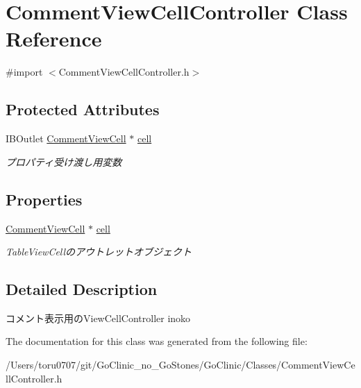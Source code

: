 \hypertarget{interface_comment_view_cell_controller}{
\section{CommentViewCellController Class Reference}
\label{interface_comment_view_cell_controller}
}


{\ttfamily \#import $<$CommentViewCellController.h$>$}

\subsection*{Protected Attributes}
\begin{DoxyCompactItemize}
\item 
\hypertarget{interface_comment_view_cell_controller_ae0ac0956e5d70534a5725597e9b26d9e}{
IBOutlet \hyperlink{interface_comment_view_cell}{CommentViewCell} $\ast$ \hyperlink{interface_comment_view_cell_controller_ae0ac0956e5d70534a5725597e9b26d9e}{cell}}
\label{interface_comment_view_cell_controller_ae0ac0956e5d70534a5725597e9b26d9e}

\begin{DoxyCompactList}\small\item\em プロパティ受け渡し用変数 \end{DoxyCompactList}\end{DoxyCompactItemize}
\subsection*{Properties}
\begin{DoxyCompactItemize}
\item 
\hypertarget{interface_comment_view_cell_controller_a951779506547b1ff03a16f911d7abf98}{
\hyperlink{interface_comment_view_cell}{CommentViewCell} $\ast$ \hyperlink{interface_comment_view_cell_controller_a951779506547b1ff03a16f911d7abf98}{cell}}
\label{interface_comment_view_cell_controller_a951779506547b1ff03a16f911d7abf98}

\begin{DoxyCompactList}\small\item\em TableViewCellのアウトレットオブジェクト \end{DoxyCompactList}\end{DoxyCompactItemize}


\subsection{Detailed Description}
コメント表示用のViewCellController  inoko 

The documentation for this class was generated from the following file:\begin{DoxyCompactItemize}
\item 
/Users/toru0707/git/GoClinic\_\-no\_\-GoStones/GoClinic/Classes/CommentViewCellController.h\end{DoxyCompactItemize}
